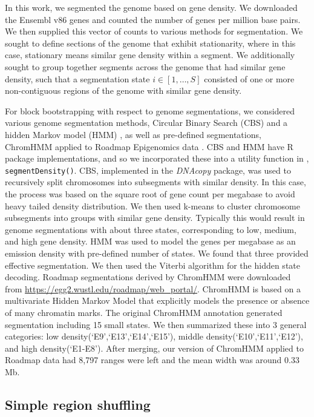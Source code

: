 \documentclass{article}
\begin{document}
In this work, we segmented the genome based on gene density. We
downloaded the Ensembl v86 genes \citep{ensemblTrimmedEntry} 
and counted the 
number of genes per million base pairs. We then supplied this vector
of counts to various methods for segmentation. We sought to define
sections of the genome that exhibit stationarity, where in this case,
stationary means similar gene density within a segment. We
additionally sought to group together segments across the genome that
had similar gene density, such that a segmentation state
$i \in [1,\dots,S]$ consisted of one or more non-contiguous regions of
the genome with similar gene density.

For block bootstrapping with respect to genome segmentations,
we considered various genome segmentation methods,
Circular Binary Search (CBS) \citep{cbs} and a hidden Markov model (HMM)
\citep{rcpphmm}, as well as pre-defined segmentations,
ChromHMM applied to 
Roadmap Epigenomics data \citep{ernst2012chromhmm}.
CBS and HMM
have R package implementations, and so we incorporated these
into a utility function in \nullranges, \texttt{segmentDensity()}.
CBS, implemented in the \textit{DNAcopy} package, was used to recursively split
chromosomes into subsegments with similar density. In this case, the process was based on the square root of gene count per megabase to avoid heavy tailed density distribution. We then used k-means to cluster
chromosome subsegments into groups with similar gene
density. Typically this would result in genome segmentations with
about three states, corresponding to low, medium, and high gene
density. 
HMM was used to model the genes per megabase as an emission
density with pre-defined number of states. We found that three provided effective segmentation. 
We then used the Viterbi algorithm for the hidden state decoding. 
Roadmap segmentations derived by ChromHMM \citep{ernst2012chromhmm} were
downloaded from
\url{https://egg2.wustl.edu/roadmap/web_portal/}. ChromHMM is based on
a multivariate Hidden Markov Model that explicitly models the presence
or absence of many chromatin marks. The original ChromHMM annotation
generated segmentation including 
15 small states. We then summarized these into 3 general categories: low
density(`E9',`E13',`E14',`E15'), middle density(`E10',`E11',`E12'),
and high density(`E1-E8'). 
After merging, our version of ChromHMM applied to Roadmap data had
8,797 ranges were left and the mean width was around 
0.33 Mb.

\subsection{Simple region shuffling}\label{sec:shuffle}
\end{document}
